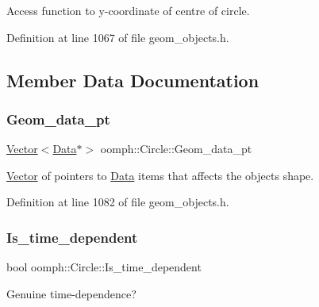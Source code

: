 Access function to y-\/coordinate of centre of circle. 



Definition at line 1067 of file geom\+\_\+objects.\+h.



\subsection{Member Data Documentation}
\mbox{\label{classoomph_1_1Circle_a5684eac02d83744f4966a2c94fb161ba}} 
\subsubsection{\texorpdfstring{Geom\+\_\+data\+\_\+pt}{Geom\_data\_pt}}
{\footnotesize\ttfamily \hyperlink{classoomph_1_1Vector}{Vector}$<$\hyperlink{classoomph_1_1Data}{Data}$\ast$$>$ oomph\+::\+Circle\+::\+Geom\+\_\+data\+\_\+pt\hspace{0.3cm}{\ttfamily [protected]}}



\hyperlink{classoomph_1_1Vector}{Vector} of pointers to \hyperlink{classoomph_1_1Data}{Data} items that affects the object\textquotesingle{}s shape. 



Definition at line 1082 of file geom\+\_\+objects.\+h.

\mbox{\label{classoomph_1_1Circle_a88486747f071c06caac4df74eab1d5ea}} 
\subsubsection{\texorpdfstring{Is\+\_\+time\+\_\+dependent}{Is\_time\_dependent}}
{\footnotesize\ttfamily bool oomph\+::\+Circle\+::\+Is\+\_\+time\+\_\+dependent\hspace{0.3cm}{\ttfamily [protected]}}



Genuine time-\/dependence? 



